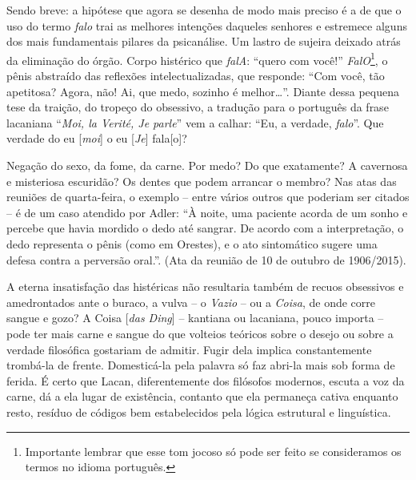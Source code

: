 Sendo breve: a hipótese que agora se desenha de modo mais preciso é a de
que o uso do termo \emph{falo} trai as melhores intenções daqueles
senhores e estremece alguns dos mais fundamentais pilares da
psicanálise. Um lastro de sujeira deixado atrás da eliminação do órgão.
Corpo histérico que \emph{falA}: ``quero com você!''
\emph{FalO}\footnote{Importante lembrar que esse tom jocoso só pode ser
  feito se consideramos os termos no idioma português.}, o pênis
abstraído das reflexões intelectualizadas, que responde: ``Com você, tão
apetitosa? Agora, não! Ai, que medo, sozinho é melhor\ldots{}''. Diante dessa
pequena tese da traição, do tropeço do obsessivo, a tradução para o
português da frase lacaniana ``\emph{Moi, la Verité, Je parle}'' vem a
calhar: ``Eu, a verdade, \emph{falo}''. Que verdade do eu
{[}\emph{moi}{]} o eu {[}\emph{Je}{]} fala{[}o{]}?

Negação do sexo, da fome, da carne. Por medo? Do que exatamente? A
cavernosa e misteriosa escuridão? Os dentes que podem arrancar o membro?
Nas atas das reuniões de quarta-feira, o exemplo -- entre vários outros
que poderiam ser citados -- é de um caso atendido por Adler: ``À noite,
uma paciente acorda de um sonho e percebe que havia mordido o dedo até
sangrar. De acordo com a interpretação, o dedo representa o pênis (como
em Orestes), e o ato sintomático sugere uma defesa contra a perversão
oral.''. (Ata da reunião de 10 de outubro de 1906/2015).

A eterna insatisfação das histéricas não resultaria também de recuos
obsessivos e amedrontados ante o buraco, a vulva -- o \emph{Vazio} -- ou
a \emph{Coisa}, de onde corre sangue e gozo? A Coisa {[}\emph{das
Ding}{]} -- kantiana ou lacaniana, pouco importa -- pode ter mais carne
e sangue do que volteios teóricos sobre o desejo ou sobre a verdade
filosófica gostariam de admitir. Fugir dela implica constantemente
trombá-la de frente. Domesticá-la pela palavra só faz abri-la mais sob
forma de ferida. É certo que Lacan, diferentemente dos filósofos
modernos, escuta a voz da carne, dá a ela lugar de existência, contanto
que ela permaneça cativa enquanto resto, resíduo de códigos bem
estabelecidos pela lógica estrutural e linguística.

